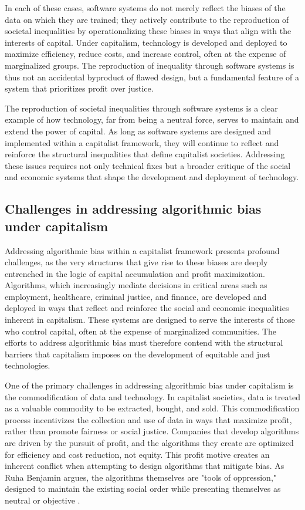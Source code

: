 In each of these cases, software systems do not merely reflect the biases of the data on which they are trained; they actively contribute to the reproduction of societal inequalities by operationalizing these biases in ways that align with the interests of capital. Under capitalism, technology is developed and deployed to maximize efficiency, reduce costs, and increase control, often at the expense of marginalized groups. The reproduction of inequality through software systems is thus not an accidental byproduct of flawed design, but a fundamental feature of a system that prioritizes profit over justice.

The reproduction of societal inequalities through software systems is a clear example of how technology, far from being a neutral force, serves to maintain and extend the power of capital. As long as software systems are designed and implemented within a capitalist framework, they will continue to reflect and reinforce the structural inequalities that define capitalist societies. Addressing these issues requires not only technical fixes but a broader critique of the social and economic systems that shape the development and deployment of technology.

\subsection{Challenges in addressing algorithmic bias under capitalism}

Addressing algorithmic bias within a capitalist framework presents profound challenges, as the very structures that give rise to these biases are deeply entrenched in the logic of capital accumulation and profit maximization. Algorithms, which increasingly mediate decisions in critical areas such as employment, healthcare, criminal justice, and finance, are developed and deployed in ways that reflect and reinforce the social and economic inequalities inherent in capitalism. These systems are designed to serve the interests of those who control capital, often at the expense of marginalized communities. The efforts to address algorithmic bias must therefore contend with the structural barriers that capitalism imposes on the development of equitable and just technologies.

One of the primary challenges in addressing algorithmic bias under capitalism is the commodification of data and technology. In capitalist societies, data is treated as a valuable commodity to be extracted, bought, and sold. This commodification process incentivizes the collection and use of data in ways that maximize profit, rather than promote fairness or social justice. Companies that develop algorithms are driven by the pursuit of profit, and the algorithms they create are optimized for efficiency and cost reduction, not equity. This profit motive creates an inherent conflict when attempting to design algorithms that mitigate bias. As Ruha Benjamin argues, the algorithms themselves are "tools of oppression," designed to maintain the existing social order while presenting themselves as neutral or objective \cite[pp.~15-18]{benjamin2019}.

